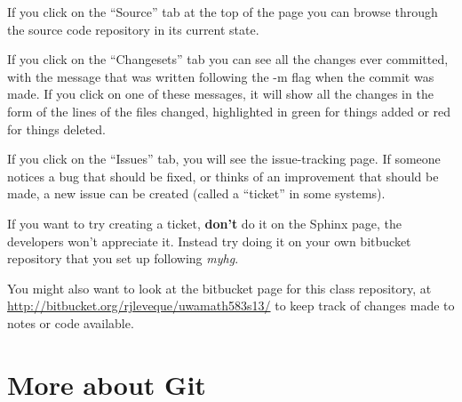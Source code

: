 \documentclass[letterpaper,10pt,english]{sphinxmanual}
\begin{document}
If you click on the ``Source'' tab at the top of the page you can browse
through the source code repository in its current state.

If you click on the ``Changesets'' tab you can see all the changes ever
committed, with the message that was written following the -m flag when the
commit was made.  If you click on one of these messages, it will show all
the changes in the form of the lines of the files changed, highlighted in
green for things added or red for things deleted.

If you click on the ``Issues'' tab, you will see the issue-tracking page.  If
someone notices a bug that should be fixed, or thinks of an improvement that
should be made, a new issue can be created (called a ``ticket'' in some systems).

If you want to try creating a ticket, \textbf{don't} do it on the Sphinx page,
the developers won't appreciate it.  Instead try doing it on your own
bitbucket repository that you set up following \emph{myhg}.

You might also want to look at the bitbucket page for this class repository,
at \href{http://bitbucket.org/rjleveque/uwamath583s13/}{http://bitbucket.org/rjleveque/uwamath583s13/} to keep track
of changes made to notes or code available.


\section{More about Git}
\label{git_more:more-about-git}\label{git_more::doc}\label{git_more:git-more}
\end{document}
